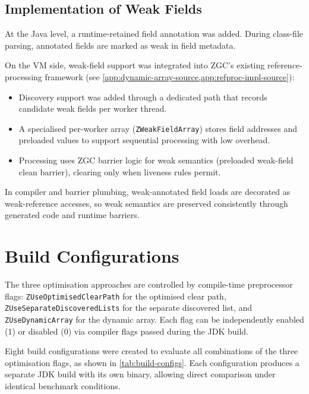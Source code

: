 \subsection{Implementation of Weak Fields}

At the Java level, a runtime-retained field annotation was added. During class-file parsing, annotated fields are marked as weak in field metadata.

On the VM side, weak-field support was integrated into ZGC's existing reference-processing framework (see \cref{app:dynamic-array-source,app:refproc-impl-source}):
\begin{itemize}
    \item Discovery support was added through a dedicated path that records candidate weak fields per worker thread.
    \item A specialised per-worker array (\texttt{ZWeakFieldArray}) stores field addresses and preloaded values to support sequential processing with low overhead.
    \item Processing uses ZGC barrier logic for weak semantics (preloaded weak-field clean barrier), clearing only when liveness rules permit.
\end{itemize}

In compiler and barrier plumbing, weak-annotated field loads are decorated as weak-reference accesses, so weak semantics are preserved consistently through generated code and runtime barriers.

\section{Build Configurations}
\label{sec:build-configurations}

The three optimisation approaches are controlled by compile-time preprocessor flags: \texttt{ZUseOptimisedClearPath} for the optimised clear path, \texttt{ZUseSeparateDiscoveredLists} for the separate discovered list, and \texttt{ZUseDynamicArray} for the dynamic array. Each flag can be independently enabled (1) or disabled (0) via compiler flags passed during the JDK build.

Eight build configurations were created to evaluate all combinations of the three optimisation flags, as shown in \cref{tab:build-configs}. Each configuration produces a separate JDK build with its own binary, allowing direct comparison under identical benchmark conditions.

